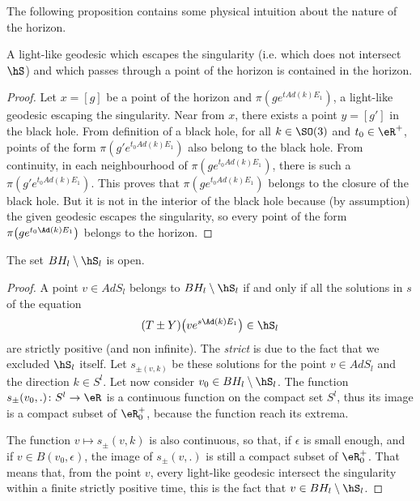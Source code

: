 The following proposition contains some physical intuition about the nature of the horizon.

\begin{proposition}
	A light-like geodesic which escapes the singularity (i.e. which does not intersect $\hS$) and which passes through a point of the horizon is contained in the horizon.
\end{proposition}

\begin{proof}
	Let $x=[g]$ be a point of the horizon and $\pi(ge^{tAd(k)E_1})$, a light-like geodesic escaping the singularity. Near from $x$, there exists a point $y=[g']$ in the black hole. From definition of a black hole, for all $k\in \SO(3)$ and $t_{0}\in\eR^{+}$, points of the form  $\pi(g'e^{t_0Ad(k)E_1})$ also belong to the black hole. From continuity, in each neighbourhood of $\pi(ge^{t_0Ad(k)E_1})$, there is such a $\pi(g'e^{t_0Ad(k)E_1})$. This proves that $\pi(ge^{t_0Ad(k)E_1})$ belongs to the closure of the black hole. But it is not in the interior of the black hole because (by assumption) the given geodesic escapes the singularity, so every point of the form $\pi\big( g e^{t_0\Ad(k)E_1} \big)$ belongs to the horizon.
\end{proof}

\begin{proposition}		\label{PropTNFerme}
	The set $BH_l\setminus\hS_l$ is open.
\end{proposition}

\begin{proof}
	A point $v\in AdS_l$ belongs to $BH_l\setminus\hS_l$ if and only if all  the solutions in $s$ of the equation
	\begin{equation}
		(T\pm Y)\big( v e^{s\Ad(k)E_1} \big)\in\hS_l
	\end{equation}
	are strictly positive (and non infinite). The \emph{strict} is due to the fact that we excluded $\hS_l$ itself. Let $s_{\pm(v,k)}$ be these solutions for the point $v\in AdS_l$ and the direction $k\in S^l$. Let now consider $v_0\in BH_l\setminus\hS_l$. The function $s_{\pm}(v_0,.)\colon S^l\to \eR$ is a continuous function on the compact set $S^l$, thus its image is a compact subset of $\eR_0^+$, because the function reach its extrema.

	The function $v\mapsto s_{\pm}(v,k)$ is also continuous, so that, if $\epsilon$ is small enough, and if $v\in B(v_0,\epsilon)$, the image of $s_{\pm}(v,.)$ is still a compact subset of $\eR_0^+$. That means that, from the point $v$, every light-like geodesic intersect the singularity within a finite strictly positive time, this is the fact that $v\in BH_l\setminus\hS_l$.
\end{proof}

